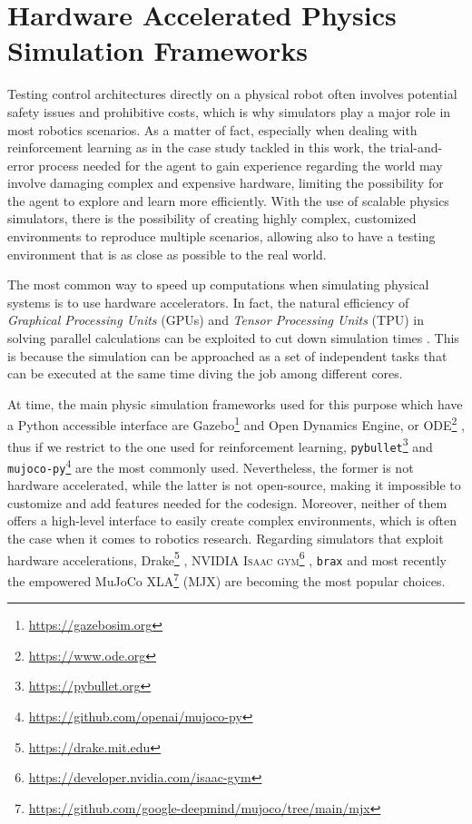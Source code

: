 \chapter{Hardware Accelerated Physics Simulation Frameworks}
\label{chp:back_PhysicsSimulators}


Testing control architectures directly on a physical robot often involves potential safety issues and prohibitive costs, which is why simulators play a major role in most robotics scenarios. As a matter of fact, especially when dealing with reinforcement learning as in the case study tackled in this work, the trial-and-error process needed for the agent to gain experience regarding the world may involve damaging complex and expensive hardware, limiting the possibility for the agent to explore and learn more efficiently. With the use of scalable physics simulators, there is the possibility of creating highly complex, customized environments to reproduce multiple scenarios, allowing also to have a testing environment that is as close as possible to the real world.

The most common way to speed up computations when simulating physical systems is to use hardware accelerators. In fact, the natural efficiency of \textit{Graphical Processing Units} (\ac{GPU}s) and \textit{Tensor Processing Units} (\ac{TPU}) in solving parallel calculations can be exploited to cut down simulation times \citep{liang_gpu-accelerated_2018}. This is because the simulation can be approached as a set of independent tasks that can be executed at the same time diving the job among different cores.

At time, the main physic simulation frameworks used for this purpose which have a Python accessible interface are Gazebo\footnote{\url{https://gazebosim.org}} \citep{Koenig2004} and Open Dynamics Engine, or ODE\footnote{\url{https://www.ode.org}}\citep{ode:2008} \citep{erez_simulation_2015,ivaldi:hal-01116148}, thus if we restrict to the one used for reinforcement learning, \texttt{pybullet}\footnote{\url{https://pybullet.org}}\citep{coumans_pybullet_2016} and \texttt{mujoco-py}\footnote{\url{https://github.com/openai/mujoco-py}}\citep{todorov_mujoco_2012} are the most commonly used. Nevertheless, the former is not hardware accelerated, while the latter is not open-source, making it impossible to customize and add features needed for the codesign. Moreover, neither of them offers a high-level interface to easily create complex environments, which is often the case when it comes to robotics research.
Regarding simulators that exploit hardware accelerations, Drake\footnote{\url{https://drake.mit.edu}}
\citep{drake}, NVIDIA \textsc{Isaac gym}\footnote{\url{https://developer.nvidia.com/isaac-gym}} \citep{makoviychuk_isaac_2021}, \texttt{brax} \citep{freeman_brax_2021} and most recently the \jax empowered MuJoCo XLA\footnote{\url{https://github.com/google-deepmind/mujoco/tree/main/mjx}} (MJX) are becoming the most popular choices.

